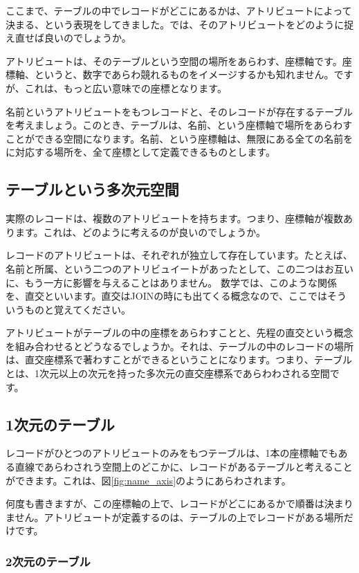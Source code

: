 ここまで、テーブルの中でレコードがどこにあるかは、アトリビュートによって決まる、という表現をしてきました。では、そのアトリビュートをどのように捉え直せば良いのでしょうか。

アトリビュートは、そのテーブルという空間の場所をあらわす、座標軸です。座標軸、というと、数字であらわ競れるものをイメージするかも知れません。ですが、これは、もっと広い意味での座標となります。

名前というアトリビュートをもつレコードと、そのレコードが存在するテーブルを考えましょう。このとき、テーブルは、名前、という座標軸で場所をあらわすことができる空間になります。名前、という座標軸は、無限にある全ての名前をに対応する場所を、全て座標として定義できるものとします。

\subsection{テーブルという多次元空間}

実際のレコードは、複数のアトリビュートを持ちます。つまり、座標軸が複数あります。これは、どのように考えるのが良いのでしょうか。

レコードのアトリビュートは、それぞれが独立して存在しています。たとえば、名前と所属、という二つのアトリビュイートがあったとして、この二つはお互いに、もう一方に影響を与えることはありません。
数学では、このような関係を、直交といいます。直交はJOINの時にも出てくる概念なので、ここではそういうものと覚えてください。

アトリビュートがテーブルの中の座標をあらわすことと、先程の直交という概念を組み合わせるとどうなるでしょうか。それは、テーブルの中のレコードの場所は、直交座標系で著わすことができるということになります。つまり、テーブルとは、1次元以上の次元を持った多次元の直交座標系であらわわされる空間です。

\subsection{1次元のテーブル}

レコードがひとつのアトリビュートのみをもつテーブルは、1本の座標軸でもある直線であらわされう空間上のどこかに、レコードがあるテーブルと考えることができます。これは、図\ref{fig:name_axis}のようにあらわされます。

何度も書きますが、この座標軸の上で、レコードがどこにあるかで順番は決まりません。アトリビュートが定義するのは、テーブルの上でレコードがある場所だけです。

\subsubsection{2次元のテーブル}

